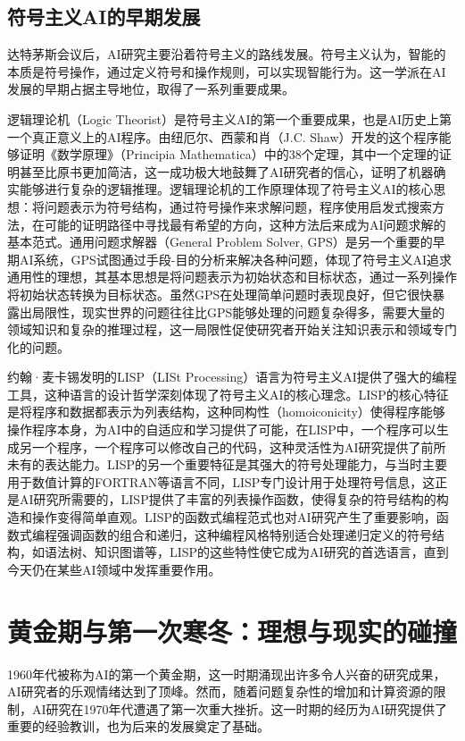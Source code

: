\subsection{符号主义AI的早期发展}

达特茅斯会议后，AI研究主要沿着符号主义的路线发展。符号主义认为，智能的本质是符号操作，通过定义符号和操作规则，可以实现智能行为。这一学派在AI发展的早期占据主导地位，取得了一系列重要成果。

逻辑理论机（Logic Theorist）是符号主义AI的第一个重要成果，也是AI历史上第一个真正意义上的AI程序。由纽厄尔、西蒙和肖（J.C. Shaw）开发的这个程序能够证明《数学原理》（Principia Mathematica）中的38个定理，其中一个定理的证明甚至比原书更加简洁，这一成功极大地鼓舞了AI研究者的信心，证明了机器确实能够进行复杂的逻辑推理。逻辑理论机的工作原理体现了符号主义AI的核心思想：将问题表示为符号结构，通过符号操作来求解问题，程序使用启发式搜索方法，在可能的证明路径中寻找最有希望的方向，这种方法后来成为AI问题求解的基本范式。通用问题求解器（General Problem Solver, GPS）是另一个重要的早期AI系统，GPS试图通过手段-目的分析来解决各种问题，体现了符号主义AI追求通用性的理想，其基本思想是将问题表示为初始状态和目标状态，通过一系列操作将初始状态转换为目标状态。虽然GPS在处理简单问题时表现良好，但它很快暴露出局限性，现实世界的问题往往比GPS能够处理的问题复杂得多，需要大量的领域知识和复杂的推理过程，这一局限性促使研究者开始关注知识表示和领域专门化的问题。

约翰·麦卡锡发明的LISP（LISt Processing）语言为符号主义AI提供了强大的编程工具，这种语言的设计哲学深刻体现了符号主义AI的核心理念。LISP的核心特征是将程序和数据都表示为列表结构，这种同构性（homoiconicity）使得程序能够操作程序本身，为AI中的自适应和学习提供了可能，在LISP中，一个程序可以生成另一个程序，一个程序可以修改自己的代码，这种灵活性为AI研究提供了前所未有的表达能力。LISP的另一个重要特征是其强大的符号处理能力，与当时主要用于数值计算的FORTRAN等语言不同，LISP专门设计用于处理符号信息，这正是AI研究所需要的，LISP提供了丰富的列表操作函数，使得复杂的符号结构的构造和操作变得简单直观。LISP的函数式编程范式也对AI研究产生了重要影响，函数式编程强调函数的组合和递归，这种编程风格特别适合处理递归定义的符号结构，如语法树、知识图谱等，LISP的这些特性使它成为AI研究的首选语言，直到今天仍在某些AI领域中发挥重要作用。

\section{黄金期与第一次寒冬：理想与现实的碰撞}

1960年代被称为AI的第一个黄金期，这一时期涌现出许多令人兴奋的研究成果，AI研究者的乐观情绪达到了顶峰。然而，随着问题复杂性的增加和计算资源的限制，AI研究在1970年代遭遇了第一次重大挫折。这一时期的经历为AI研究提供了重要的经验教训，也为后来的发展奠定了基础。


